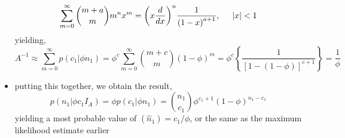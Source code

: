 \documentclass[../jaynes_prob_theory_notes.tex]{subfiles}
\begin{document}
\begin{itemize}
                \begin{equation*}
                    \sum^{\infty}_{m=0} \binom{m+a}{m}m^{n}x^{m} = {\left( x \frac{d}{dx} \right)}^{n} \frac{1}{{(1-x)}^{a+1}},  \hspace{0.5cm} |x| < 1
                \end{equation*}
                yielding,
                \begin{equation*}
                    A^{-1} \approx \sum^{\infty}_{m=0} p(c_1|{\phi}n_1) = {\phi}^{c} \sum^{\infty}_{m=0} \binom{m+c}{m} {(1-\phi)}^{m} = {\phi}^{c} \left \{ \frac{1}{{[1-(1-\phi)]}^{c+1}} \right \} = \frac{1}{\phi}
                \end{equation*}
            \item putting this together, we obtain the result,
                \begin{equation*}
                    p(n_1|{\phi}c_{1}I_{A}) = {\phi}p(c_1|{\phi}n_1) = \binom{n_1}{c_1}{\phi}^{c_1 + 1} {(1 - \phi)}^{n_1 - c_1}
                \end{equation*}
                yielding a most probable value of $(\hat{n}_1) = c_1 / \phi$, or the same as the maximum likelihood estimate earlier
        \end{itemize}
\end{document}
